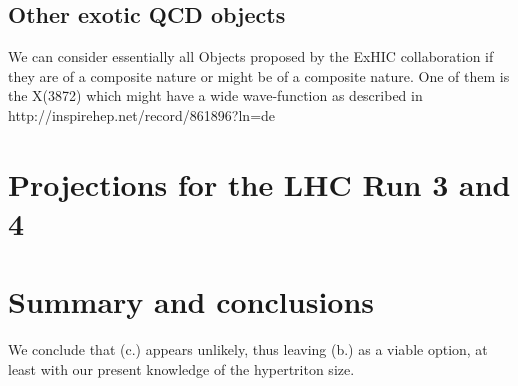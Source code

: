 \documentclass[a4paper,11pt]{scrartcl} %
\begin{document}
\subsection{Other exotic QCD objects}

We can consider essentially all Objects proposed by the ExHIC collaboration if they are of a composite nature or might be of a composite nature. One of them is the X(3872) which might have a wide wave-function as described in http://inspirehep.net/record/861896?ln=de

\section{Projections for the LHC Run 3 and 4}\label{sec:projections}

\section{Summary and conclusions}

We conclude that (c.) appears unlikely, thus leaving (b.) as a viable option, at least with our present knowledge of the hypertriton size.


\end{document}
